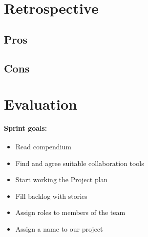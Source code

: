 \section{Retrospective}
\subsection{Pros}
\subsection{Cons}
\section{Evaluation}


\paragraph{Sprint goals:}
\begin{itemize}
    \item Read compendium
    \item Find and agree suitable collaboration tools
    \item Start working the Project plan
    \item Fill backlog with stories
    \item Assign roles to members of the team
    \item Assign a name to our project
\end{itemize}